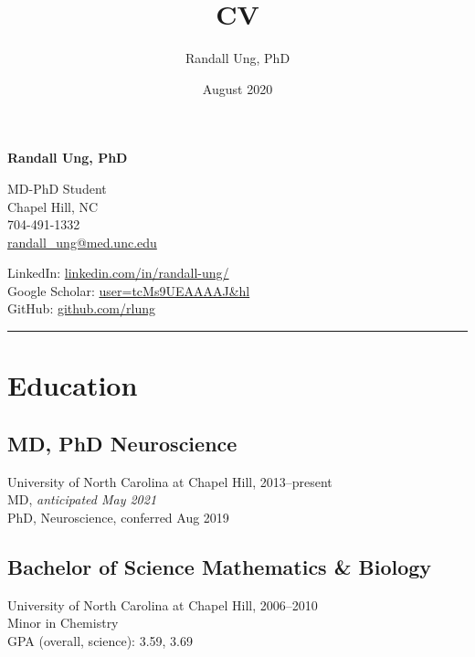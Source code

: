 \documentclass{article}
\title{CV}
\author{Randall Ung, PhD}
\date{August 2020}
\begin{document}
{\Huge \textbf{Randall Ung, PhD}} \\
{
\begin{multicols}{2}
  \large
  MD-PhD Student \\
  Chapel Hill, NC \\
  704-491-1332 \\
  \href{mailto:randall_ung@med.unc.edu}{randall\_ung@med.unc.edu} \\
  
  \columnbreak
  
  \vspace*{\fill}
  \small
  LinkedIn: \href{https://www.linkedin.com/in/randall-ung/}{linkedin.com/in/randall-ung/} \\
  Google Scholar: \href{https://scholar.google.com/citations?user=tcMs9UEAAAAJ&hl=en}{user=tcMs9UEAAAAJ&hl} \\
  GitHub: \href{https://github.com/rlung}{github.com/rlung} \\
\end{multicols}
}

\rule{0.8\textwidth}{0.5pt}

\section*{Education}
  \subsection*{MD, PhD \textbar{} Neuroscience}
    University of North Carolina at Chapel Hill, 2013--present \\
    MD, \textit{anticipated May 2021} \\
    PhD, Neuroscience, conferred Aug 2019

  \subsection*{Bachelor of Science \textbar{} Mathematics \& Biology}
    University of North Carolina at Chapel Hill, 2006--2010 \\
    Minor in Chemistry \\
    GPA (overall, science): 3.59, 3.69
\end{document}
